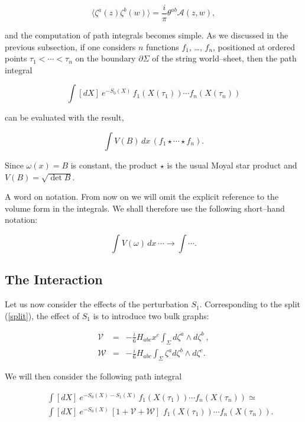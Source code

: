 \documentclass[a4paper,11pt]{article}
\begin{document}
$$
\langle \zeta^{a}\left( z\right) \zeta^{b}\left( w\right) \rangle 
= \frac{i}{\pi} \theta^{ab} \mathcal{A}\left( z,w\right) ,
$$

\noindent
and the computation of path integrals becomes simple. As we discussed in the
previous subsection, if one considers $n$ functions $f_{1}$, \ldots, 
$f_{n}$, positioned at ordered points $\tau _{1} < \cdots < \tau _{n}$ on the 
boundary $\partial \Sigma$ of the string world--sheet, then the path integral

\begin{equation}
\int [dX]\ e^{-S_{0} \left( X\right) } \, f_{1} \left( X\left( \tau 
_{1} \right) \right) \cdots f_{n} \left( X\left( \tau _{n} \right) \right)
\label{free}
\end{equation}

\noindent
can be evaluated \cite{Schomerus, Seiberg-Witten} with the result,

$$
\int V\left( B\right) \,dx\,\left( f_{1}\star \cdots \star f_{n}\right) .
$$

\noindent
Since $\omega \left( x\right) = B$ is constant, the product $\star$ is the
usual Moyal star product and $V\left( B\right) = \sqrt{ \det B }$.

A word on notation. From now on we will omit the explicit reference to the
volume form in the integrals. We shall therefore use the following 
short--hand notation:

$$
\int V\left( \omega \right) \,dx\,\cdots \rightarrow \int \cdots .
$$


\subsection{The Interaction}


Let us now consider the effects of the perturbation $S_{1}$. Corresponding
to the split (\ref{split}), the effect of $S_{1}$ is to introduce two bulk
graphs:

\begin{eqnarray}
\mathcal{V} &=& -\frac{i}{6} H_{abc}x^{c} \int_{\Sigma} d\zeta^{a} \wedge
d\zeta^{b}\ , \label{V2} \\
\mathcal{W} &=& -\frac{i}{6} H_{abc} \int_{\Sigma} \zeta^{a} d\zeta^{b} 
\wedge d\zeta^{c}. \label{V3}
\end{eqnarray}

\noindent
We will then consider the following path integral

\begin{eqnarray}
&& \int [dX]\ e^{-S_{0}\left( X\right) - S_{1}\left( X\right) }\,f_{1} 
\left( X \left( \tau _{1} \right) \right) \cdots f_{n} \left( X \left( 
\tau_{n} \right) \right) \simeq \nonumber \\
&& \int [dX]\ e^{-S_{0}\left( X\right)}\, \left[ 1 + \mathcal{V} + 
\mathcal{W} \right] \,\, f_{1} \left( X \left( \tau_{1} \right) \right) 
\cdots f_{n}\left( X \left( \tau_{n} \right) \right) .
\label{pathInt}
\end{eqnarray}
\end{document}
